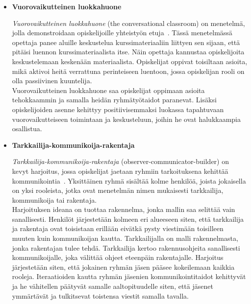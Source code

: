 \documentclass[finnish]{../tktltiki2}
\theoremstyle{definition}
\theoremstyle{remark}
\begin{document}
\begin{itemize}

\item {\bf Vuorovaikutteinen luokkahuone}

\emph{Vuorovaikutteinen luokkahuone} (the conversational classroom) on menetelmä, jolla demonstroidaan opiskelijoille yhteistyön etuja~\cite{Waite:2004:SCV:1028174.971308}. Tässä menetelmässä opettaja panee aluille keskustelua kurssimateriaaliin liittyen sen sijaan, että pitäisi luennon kurssimateriaalista itse. Näin opettaja kannustaa opiskelijoita keskustelemaan keskenään materiaalista. Opiskelijat oppivat toisiltaan asioita, mikä
aktivoi heitä verrattuna perinteiseen luentoon, jossa opiskelijan
rooli on olla passiivinen kuuntelija.\\

Vuorovaikutteinen luokkahuone saa opiskelijat oppimaan asioita tehokkaammin ja samalla heidän ryhmätyötaidot paranevat.
Lisäksi opiskelijoiden asenne kehittyy positiivisemmaksi luokassa tapahtuvaan vuorovaikutteiseen toimintaan ja keskusteluun, joihin he ovat halukkaampia osallistua.

\item {\bf Tarkkailija-kommunikoija-rakentaja}

\emph{Tarkkailija-kommunikoija-rakentaja} (observer-communicator-builder) on kevyt harjoitus, jossa
opiskelijat jaetaan ryhmiin tarkoituksena kehittää
kommunikointia~\cite{Cushing:2003:TBP:948785.948797}. Yksittäinen
ryhmä sisältää kolme henkilöä, joista jokaisella on yksi
rooleista, jotka ovat menetelmän nimen mukaisesti tarkkailija, kommunikoija tai rakentaja.\\

Harjoituksen ideana on tuottaa rakennelma, jonka mallin saa selittää vain sanallisesti. Henkilöt järjestetään
kolmeen eri alueeseen siten, että tarkkailija ja rakentaja ovat
toisistaan erillään eivätkä pysty viestimään toisilleen muuten
kuin kommunikoijan kautta. Tarkkailijalla on malli rakennelmasta,
jonka rakentajan tulee tehdä. Tarkkailija kertoo rakennusohjeita
sanallisesti kommunikoijalle, joka välittää ohjeet eteenpäin rakentajalle. Harjoitus järjestetään siten, että jokainen ryhmän
jäsen pääsee kokeilemaan kaikkia rooleja. Iteraatioiden kautta
ryhmän jäsenien kommunikointitaidot kehittyvät ja he vähitellen päätyvät samalle aaltopituudelle siten, että jäsenet ymmärtävät ja tulkitsevat toistensa viestit samalla tavalla.


\end{itemize}
\end{document}
